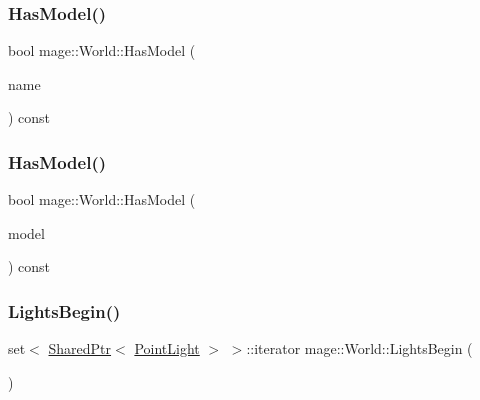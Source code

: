 \hypertarget{classmage_1_1_world_a381e0a56fc1ba6d0955a248f7b0f0c22}{}\label{classmage_1_1_world_a381e0a56fc1ba6d0955a248f7b0f0c22} 
\subsubsection{\texorpdfstring{Has\+Model()}{HasModel()}\hspace{0.1cm}{\footnotesize\ttfamily [1/2]}}
{\footnotesize\ttfamily bool mage\+::\+World\+::\+Has\+Model (\begin{DoxyParamCaption}\item[{const string \&}]{name }\end{DoxyParamCaption}) const}

\hypertarget{classmage_1_1_world_a821d420241b2a94502b20e24595490df}{}\label{classmage_1_1_world_a821d420241b2a94502b20e24595490df} 
\subsubsection{\texorpdfstring{Has\+Model()}{HasModel()}\hspace{0.1cm}{\footnotesize\ttfamily [2/2]}}
{\footnotesize\ttfamily bool mage\+::\+World\+::\+Has\+Model (\begin{DoxyParamCaption}\item[{const \hyperlink{namespacemage_a1e01ae66713838a7a67d30e44c67703e}{Shared\+Ptr}$<$ \hyperlink{classmage_1_1_model}{Model} $>$}]{model }\end{DoxyParamCaption}) const}

\hypertarget{classmage_1_1_world_a48964d5262a080dd866e612d7daa6bf2}{}\label{classmage_1_1_world_a48964d5262a080dd866e612d7daa6bf2} 
\subsubsection{\texorpdfstring{Lights\+Begin()}{LightsBegin()}\hspace{0.1cm}{\footnotesize\ttfamily [1/2]}}
{\footnotesize\ttfamily set$<$ \hyperlink{namespacemage_a1e01ae66713838a7a67d30e44c67703e}{Shared\+Ptr}$<$ \hyperlink{structmage_1_1_point_light}{Point\+Light} $>$ $>$\+::iterator mage\+::\+World\+::\+Lights\+Begin (\begin{DoxyParamCaption}{ }\end{DoxyParamCaption})}

